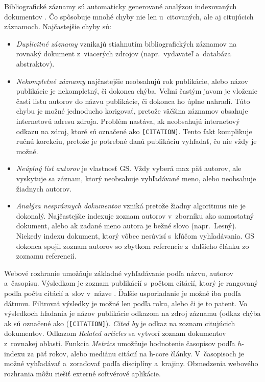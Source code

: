 Bibliografické záznamy sú automaticky generované analýzou indexovaných
dokumentov \citep{Vine2006}.  Čo spôsobuje mnohé chyby nie len u~citovaných, ale
aj citujúcich záznamoch.  Najčastejšie chyby sú:
\begin{itemize}
\item \emph{Duplicitné záznamy} vznikajú stiahnutím bibliografických záznamov na
  rovnaký dokument z~viacerých zdrojov (napr.~vydavateľ a~databáza abstraktov).
\item \emph{Nekompletné záznamy} najčastejšie neobsahujú rok publikácie, alebo
  názov publikácie je nekompletný, či dokonca chýba.  Veľmi častým javom je
  vloženie časti listu autorov do názvu publikácie, či dokonca ho úplne nahradí.
  Túto chybu je možné jednoducho korigovať, pretože väčšina záznamov obsahuje
  internetovú adresu zdroja.  Problém nastáva, ak neobsahujú internetový odkazu
  na zdroj, ktoré sú označené ako \texttt{[CITATION]}.  Tento fakt komplikuje
  ručnú korekciu, pretože je potrebné danú publikáciu vyhľadať, čo nie vždy je
  možné.
\item \emph{Neúplný list autorov} je vlastnosť GS.  Vždy vyberá max päť autorov,
  ale vyskytuje sa záznam, ktorý neobsahuje vyhľadávané meno, alebo neobsahuje
  žiadnych autorov.
\item \emph{Analýza nesprávnych dokumentov} vzniká pretože žiadny algoritmus nie
  je dokonalý.  Najčastejšie indexuje zoznam autorov v~zborníku ako samostatný
  dokument, alebo ak zadané meno autora je bežné slovo (napr.~Lesný).  Niekedy
  indexu dokument, ktorý vôbec nesúvisí s~kľúčom vyhľadávania.  GS dokonca
  spojil zoznam autorov so zbytkom referencie z~ďalšieho článku zo zoznamu
  referencií.
\end{itemize}

\noindent Webové rozhranie umožňuje základné vyhľadávanie podľa názvu, autorov
a~časopisu.  Výsledkom je zoznam publikácií s~počtom citácií, ktorý je rangovaný
podľa počtu citácií a~slov v~názve \citep{Beel2009}.  Ďalšie usporiadanie je
možné iba podľa dátumu.  Filtrovať výsledky je možné len podľa roku, alebo či je
to patent.  Vo výsledkoch hľadania je názov publikácie odkazom na zdroj záznamu
(odkaz chýba ak sú označené ako (\texttt{[CITATION]}).  \emph{Cited by} je odkaz
na zoznam citujúcich dokumentov.  Odkazom \emph{Related articles} sa vytvorí
zoznam dokumentov z~rovnakej oblasti.  Funkcia \emph{Metrics} umožňuje
hodnotenie časopisov podľa $h$-indexu za päť rokov, alebo mediánu citácií na
h-core články.  V~časopisoch je možné vyhľadávať a~zoraďovať podľa disciplíny
a~krajiny.  Obmedzenia webového rozhrania môžu riešiť externé softvérové
aplikácie.

